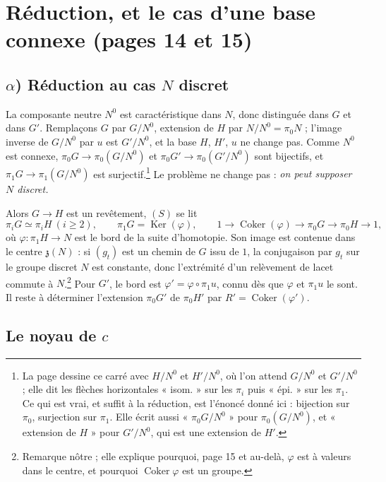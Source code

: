 \documentclass[11pt,a4paper]{article}
\begin{document}
\section*{Réduction, et le cas d'une base connexe (pages 14 et 15)}

\subsection*{$\alpha$) Réduction au cas $N$ discret}

La composante neutre $N^0$ est caractéristique dans $N$, donc distinguée dans
$G$ et dans $G'$. Remplaçons $G$ par $G/N^0$, extension de $H$ par $N/N^0 =
\pi_0 N$ ; l'image inverse de $G/N^0$ par $u$ est $G'/N^0$, et la base $H$,
$H'$, $u$ ne change pas. Comme $N^0$ est connexe, $\pi_0 G \to \pi_0(G/N^0)$
et $\pi_0 G' \to \pi_0(G'/N^0)$ sont bijectifs, et $\pi_1 G \to
\pi_1(G/N^0)$ est surjectif.\footnote{La page dessine ce carré avec
$H/N^0$ et $H'/N^0$, où l'on attend $G/N^0$ et $G'/N^0$ ; elle dit les
flèches horizontales « isom. » sur les $\pi_i$ puis « épi. » sur les $\pi_1$.
Ce qui est vrai, et suffit à la réduction, est l'énoncé donné ici : bijection
sur $\pi_0$, surjection sur $\pi_1$. Elle écrit aussi « $\pi_0 G / N^0$ »
pour $\pi_0(G/N^0)$, et « extension de $H$ » pour $G'/N^0$, qui est une
extension de $H'$.} Le problème ne change pas : \emph{on peut supposer $N$
discret.}

Alors $G \to H$ est un revêtement, $(S)$ se lit
\[
  \pi_i G \simeq \pi_i H \ (i \geqslant 2), \qquad
  \pi_1 G = \operatorname{Ker}(\varphi), \qquad
  1 \to \operatorname{Coker}(\varphi) \to \pi_0 G \to \pi_0 H \to 1 ,
\]
où $\varphi : \pi_1 H \to N$ est le bord de la suite d'homotopie. Son image
est contenue dans le centre $\mathfrak{z}(N)$ : si $(g_t)$ est un chemin de
$G$ issu de $1$, la conjugaison par $g_t$ sur le groupe discret $N$ est
constante, donc l'extrémité d'un relèvement de lacet commute à
$N$.\footnote{Remarque nôtre ; elle explique pourquoi, page 15 et au-delà,
$\varphi$ est à valeurs dans le centre, et pourquoi $\operatorname{Coker}
\varphi$ est un groupe.} Pour $G'$, le bord est $\varphi' = \varphi \circ
\pi_1 u$, connu dès que $\varphi$ et $\pi_1 u$ le sont. Il reste à
déterminer l'extension $\pi_0 G'$ de $\pi_0 H'$ par $R' =
\operatorname{Coker}(\varphi')$.

\subsection*{Le noyau de $c$}
\end{document}
